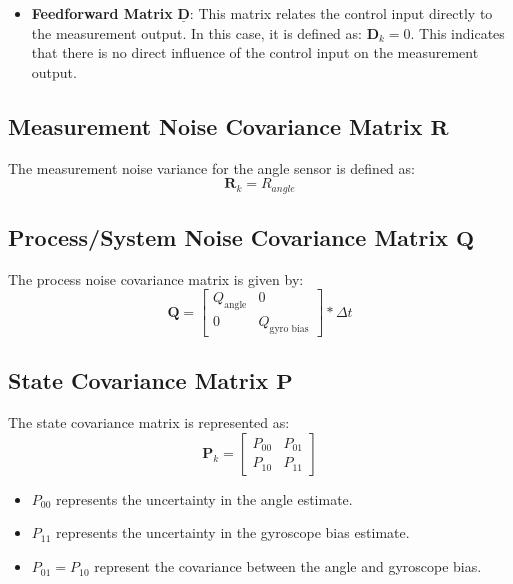 \begin{appendices}
\begin{itemize}
	\item \textbf{Feedforward Matrix} $\underline{\mathbf{D}}$: This matrix relates the control input directly to the measurement output. In this case, it is defined as: $\mathbf{D}_k = 0$. This indicates that there is no direct influence of the control input on the measurement output.	
\end{itemize}


\subsection{Measurement Noise Covariance Matrix $\mathbf{R}$}
The measurement noise variance for the angle sensor is defined as:
\begin{equation} \mathbf{R}_{k} = R_{angle} \end{equation}


\subsection{Process/System Noise Covariance Matrix $\mathbf{Q}$}
The process noise covariance matrix is given by:
\begin{equation}
	\mathbf{Q} = \begin{bmatrix} Q_{\text{angle}} & 0 \\ 0 & Q_{\text{gyro bias}} \end{bmatrix} * \Delta t  \label{eq:eq}
\end{equation}


\subsection{State Covariance Matrix $\mathbf{P}$}
The state covariance matrix is represented as:
\begin{equation}
	\mathbf{P}_k = \begin{bmatrix} P_{00} & P_{01} \\ P_{10} & P_{11} \end{bmatrix}  \label{eq:eq}
\end{equation}
\begin{itemize}
	\item $P_{00}$ represents the uncertainty in the angle estimate.
	\item $P_{11}$ represents the uncertainty in the gyroscope bias estimate.
	\item $P_{01} = P_{10}$ represent the covariance between the angle and gyroscope bias.
\end{itemize}



\end{appendices}
